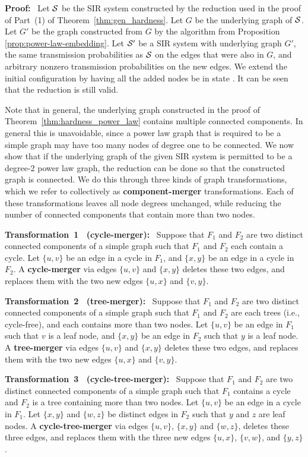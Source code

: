 \noindent
\textbf{Proof:}~  
Let $\mbox{${\cal S}$}{}$ be the SIR system constructed by the reduction used
in the proof of Part~(1) of Theorem~\ref{thm:gen_hardness}.  
Let $G$ be the underlying graph
of $\mbox{${\cal S}$}{}$.  Let $G'$ be the graph constructed from $G$ by the
algorithm from Proposition \ref{prop:power-law-embedding}.  Let
$\mbox{$\mathcal{S}'$}{}$ be a SIR system with underlying graph $G'$, the same
transmission probabilities as $\mbox{${\cal S}$}{}$ on the edges that were also
in $G$, and arbitrary nonzero transmission probabilities on the new
edges.  We extend the initial configuration by having all the added
nodes be in state \sstate.  It can be seen that the reduction is
still valid.
\QED

Note that in general, the underlying graph constructed in the proof
of Theorem~\ref{thm:hardness_power_law} contains multiple
connected components. In general this is unavoidable, since a power
law graph that is required to be a simple graph may have too many
nodes of degree one to be connected.
We now show that if the underlying graph of the given SIR system
is permitted to be a degree-2 power law graph, the reduction can
be done so that the constructed graph is connected.
We do this through three kinds of graph transformations, which we refer
to collectively as {\bf component-merger} transformations.  Each
of these transformations leaves all node degrees unchanged, while
reducing the number of connected components that contain more than
two nodes.

\medskip
\noindent
\textbf{Transformation~1~ (cycle-merger):}~
Suppose that $F_1$ and $F_2$ are two distinct connected
components of a simple graph such that $F_1$ and $F_2$ each contain
a cycle.  Let $\{u, v\}$ be an edge in a cycle in $F_1$, and $\{x, y\}$
be an edge in a cycle in $F_2$.  A {\bf cycle-merger} via edges
$\{u, v\}$ and $\{x, y\}$ deletes these two edges, and replaces them
with the two new edges $\{u, x\}$ and $\{v, y\}$.

\medskip
\noindent
\textbf{Transformation~2~ (tree-merger):}~
Suppose that $F_1$ and $F_2$ are two distinct connected
components of a simple graph such that $F_1$ and $F_2$ are each
trees (i.e., cycle-free), and each contains more than two nodes.
Let $\{u, v\}$ be an edge in $F_1$ such that $v$ is a leaf node, and
$\{x, y\}$ be an edge in $F_2$ such that $y$ is a leaf node.  A {\bf
tree-merger} via edges $\{u, v\}$ and $\{x, y\}$ deletes these two
edges, and replaces them with the two new edges $\{u, x\}$ and $\{v, y\}$.

\medskip
\noindent
\textbf{Transformation~3~ (cycle-tree-merger):}~
Suppose that $F_1$ and $F_2$ are two distinct connected
components of a simple graph such that $F_1$ contains a cycle and
$F_2$ is a tree containing more than two nodes.  Let $\{u, v\}$ be
an edge in a cycle in $F_1$.  Let $\{x, y\}$ and $\{w, z\}$ be distinct
edges in $F_2$ such that $y$ and $z$ are leaf nodes.  A {\bf
cycle-tree-merger} via edges $\{u, v\}$, $\{x, y\}$ and $\{w, z\}$, deletes
these three edges, and replaces them with the three new edges 
$\{u, x\}$, $\{v, w\}$, and $\{y, z\}$.

